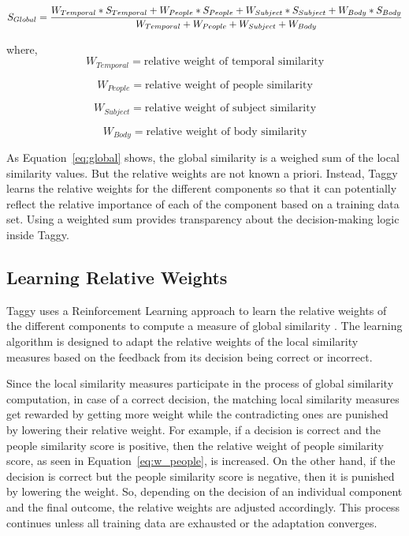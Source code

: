 \begin{equation}
	\label{eq:global}
S_{Global} = \frac{W_{Temporal} * S_{Temporal} + W_{People} * S_{People} + W_{Subject} * S_{Subject} + W_{Body} * S_{Body}} {W_{Temporal} + W_{People} + W_{Subject} + W_{Body}}\\
\end{equation}

where,
\begin{equation}
	\label{eq:w_temporal}	
W_{Temporal} = \mbox{relative weight of temporal similarity}
\end{equation}      

\begin{equation}   
		\label{eq:w_people}
W_{People} = \mbox{relative weight of people similarity}
\end{equation}

\begin{equation}     
		\label{eq:w_subject}
W_{Subject} = \mbox{relative weight of subject similarity}
\end{equation}

\begin{equation}     
		\label{eq:w_body}
W_{Body} = \mbox{relative weight of body similarity}
\end{equation}

As Equation~\ref{eq:global} shows, the global similarity is a weighed sum of the local similarity values. But the relative weights are not known a priori. Instead, Taggy learns the relative weights for the different components so that it can potentially reflect the relative importance of each of the component based on a training data set. Using a weighted sum provides transparency about the decision-making logic inside Taggy.
	
\subsection{Learning Relative Weights}	
\label{sec:learning}
Taggy uses a Reinforcement Learning approach to learn the relative weights of the different components to compute a measure of global similarity \cite{reinforcement_learning}. The learning algorithm is designed to adapt the relative weights of the local similarity measures based on the feedback from its decision being correct or incorrect.

Since the local similarity measures participate in the process of global similarity computation, in case of a correct decision, the matching local similarity measures get rewarded by getting more weight while the contradicting ones are punished by lowering their relative weight. For example, if a decision is correct and the people similarity score is positive, then the relative weight of people similarity score, as seen in Equation~\ref{eq:w_people}, is increased. On the other hand, if the decision is correct but the people similarity score is negative, then it is punished by lowering the weight. So, depending on the decision of an individual component and the final outcome, the relative weights are adjusted accordingly. This process continues unless all training data are exhausted or the adaptation converges.

